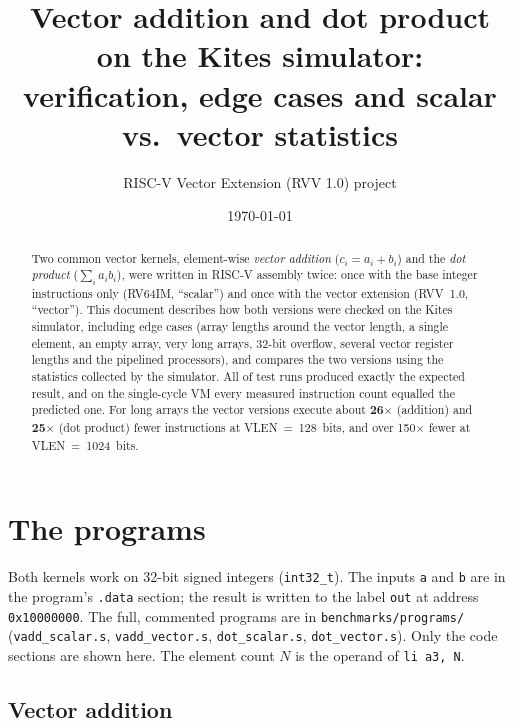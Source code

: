 \documentclass[11pt,a4paper]{article}
\title{Vector addition and dot product on the Kites simulator:\\
       verification, edge cases and scalar vs.\ vector statistics}
\author{RISC-V Vector Extension (RVV 1.0) project}
\date{\today}
\newcommand{\code}[1]{\texttt{#1}}
\begin{document}
\maketitle

\begin{abstract}
Two common vector kernels, element-wise \emph{vector addition} ($c_i = a_i + b_i$) and the
\emph{dot product} ($\sum_i a_i b_i$), were written in RISC-V assembly twice: once with the
base integer instructions only (RV64IM, ``scalar'') and once with the vector extension
(RVV~1.0, ``vector''). This document describes how both versions were checked on the Kites
simulator, including edge cases (array lengths around the vector length, a single element, an
empty array, very long arrays, 32-bit overflow, several vector register lengths and the pipelined
processors), and compares the two versions using the statistics collected by the simulator.
All \runsPassed{} of \runsTotal{} test runs produced exactly the expected result, and on the
single-cycle VM every measured instruction count equalled the predicted one. For long arrays the vector versions execute about
\textbf{26$\times$} (addition) and \textbf{25$\times$} (dot product) fewer instructions at
VLEN~=~128~bits, and over 150$\times$ fewer at VLEN~=~1024~bits.
\end{abstract}

\tableofcontents

\section{The programs}

Both kernels work on 32-bit signed integers (\code{int32\_t}). The inputs \code{a} and
\code{b} are in the program's \code{.data} section; the result is written to the label
\code{out} at address \code{0x10000000}. The full, commented programs are in
\code{benchmarks/programs/} (\code{vadd\_scalar.s}, \code{vadd\_vector.s}, \code{dot\_scalar.s},
\code{dot\_vector.s}). Only the code sections are shown here. The element count $N$ is the
operand of \code{li a3, N}.

\subsection{Vector addition}
\end{document}
